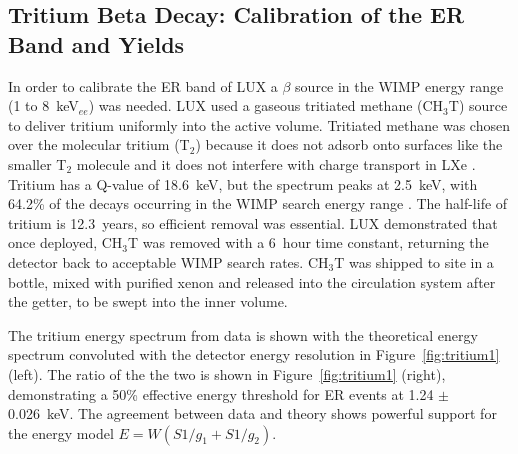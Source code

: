 \FloatBarrier
\subsection{Tritium Beta Decay: Calibration of the ER Band and Yields}
In order to calibrate the \ac{ER} band of \ac{LUX} a $\beta$ source in the \ac{WIMP} energy range (1 to 8~keV$_{ee}$) was needed. \ac{LUX} used a gaseous tritiated methane (CH$_{3}$T) source to deliver tritium uniformly into the active volume. Tritiated methane was chosen over the molecular tritium (T$_{2}$) because it does not adsorb onto surfaces like the smaller T$_{2}$ molecule and it does not interfere with charge transport in \ac{LXe} \cite{LUXTritium}. Tritium has a Q-value of 18.6~keV, but the spectrum peaks at 2.5~keV, with 64.2\% of the decays occurring in the \ac{WIMP} search energy range \cite{LUXTritium}. The half-life of tritium is 12.3~years, so efficient removal was essential. \ac{LUX} demonstrated that once deployed, CH$_{3}$T was removed with a 6~hour time constant, returning the detector back to acceptable \ac{WIMP} search rates. CH$_{3}$T was shipped to site in a bottle, mixed with purified xenon and released into the circulation system after the getter, to be swept into the inner volume. 

The tritium energy spectrum from data is shown with the theoretical energy spectrum convoluted with the detector energy resolution in Figure~\ref{fig:tritium1} (left). The ratio of the the two is shown in Figure~\ref{fig:tritium1} (right), demonstrating a 50\% effective energy threshold for \ac{ER} events at 1.24 $\pm$ 0.026~keV. The agreement between data and theory shows powerful support for the energy model $E = W (S1/g_{1} + S1/g_{2})$. 

